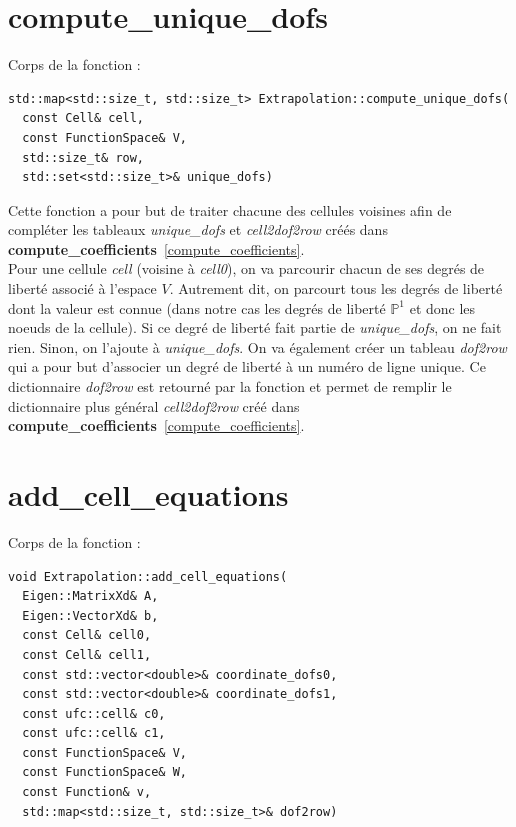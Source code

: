 \documentclass[french]{article}
\begin{document}
	
	\section{compute\_unique\_dofs}
	\label{compute_unique_dofs}
	
	Corps de la fonction :
	
	\begin{lstlisting}
std::map<std::size_t, std::size_t> Extrapolation::compute_unique_dofs(
  const Cell& cell,
  const FunctionSpace& V,
  std::size_t& row,
  std::set<std::size_t>& unique_dofs)
	\end{lstlisting}
	
	Cette fonction a pour but de traiter chacune des cellules voisines afin de compléter les tableaux \textit{unique\_dofs} et \textit{cell2dof2row} créés dans \textbf{compute\_coefficients}~\ref{compute_coefficients}.\\
	
	Pour une cellule \textit{cell} (voisine à \textit{cell0}), on va parcourir chacun de ses degrés de liberté associé à l'espace $V$. Autrement dit, on parcourt tous les degrés de liberté dont la valeur est connue (dans notre cas les degrés de liberté $\mathbb{P}^1$ et donc les noeuds de la cellule). Si ce degré de liberté fait partie de \textit{unique\_dofs}, on ne fait rien. Sinon, on l'ajoute à \textit{unique\_dofs}. On va également créer un tableau \textit{dof2row} qui a pour but d'associer un degré de liberté à un numéro de ligne unique. Ce dictionnaire \textit{dof2row} est retourné par la fonction et permet de remplir le dictionnaire plus général \textit{cell2dof2row} créé dans \textbf{compute\_coefficients}~\ref{compute_coefficients}.
	
	\section{add\_cell\_equations}
	\label{add_cell_equations}
	
	Corps de la fonction :
	
	\begin{lstlisting}
void Extrapolation::add_cell_equations(
  Eigen::MatrixXd& A,
  Eigen::VectorXd& b,
  const Cell& cell0,
  const Cell& cell1,
  const std::vector<double>& coordinate_dofs0,
  const std::vector<double>& coordinate_dofs1,
  const ufc::cell& c0,
  const ufc::cell& c1,
  const FunctionSpace& V,
  const FunctionSpace& W,
  const Function& v,
  std::map<std::size_t, std::size_t>& dof2row)
	\end{lstlisting}
\end{document}
